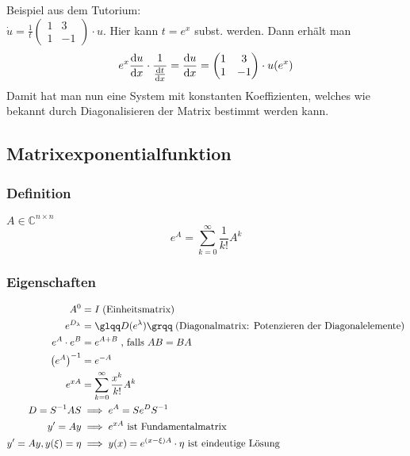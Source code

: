 Beispiel aus dem Tutorium: \\
$\dot{u}=\frac{1}{t}\left(\begin{smallmatrix}1 & 3 \\ 1 & -1 \end{smallmatrix}\right)\cdot u$. Hier kann $t=e^x$ subst. werden. Dann erhält man
\begin{equation*}
    e^x\frac{\mathop{}\!\mathrm{d} u}{\mathop{}\!\mathrm{d} x}\cdot\frac{1}{\frac{\mathop{}\!\mathrm{d} t}{\mathop{}\!\mathrm{d} x}}=\frac{\mathop{}\!\mathrm{d} u}{\mathop{}\!\mathrm{d} x}=\begin{pmatrix}
        1 & 3\\
        1 & -1\\
    \end{pmatrix}\cdot u(e^x)
\end{equation*}
Damit hat man nun eine System mit konstanten Koeffizienten, welches wie bekannt durch Diagonalisieren der Matrix bestimmt werden kann.



\subsection{Matrixexponentialfunktion}
\subsubsection{Definition}
$A \in \mathbb{C}^{n\times n}$
\begin{equation}
    \label{eq:matrixexp}
    e^A = \sum_{k=0}^\infty \frac{1}{k!} A^k
\end{equation}

\subsubsection{Eigenschaften}
\begin{align*}
    A^0 &= I \; \text{(Einheitsmatrix)}\\
    e^{D_\lambda} &= \text{\glqq} D(e^\lambda) \text{\grqq} \; \text{(Diagonalmatrix: Potenzieren der Diagonalelemente)} \\
    e^A \cdot e^B &= e^{A+B} \; \text{, falls } AB=BA\\
    \left (e^A \right )^{-1} &= e^{-A}\\
    e^{xA} &= \sum_{k=0}^\infty \frac{x^k}{k!} A^k\\
    D= S^{-1}AS & \implies e^A = S e^D S^{-1}\\
    y' = Ay & \implies e^{xA} \text{ ist Fundamentalmatrix}\\
     y' = Ay, y(\xi) = \eta & \implies y(x) = e^{(x-\xi)A}\cdot \eta 
     \text{ ist eindeutige Lösung}
\end{align*}

